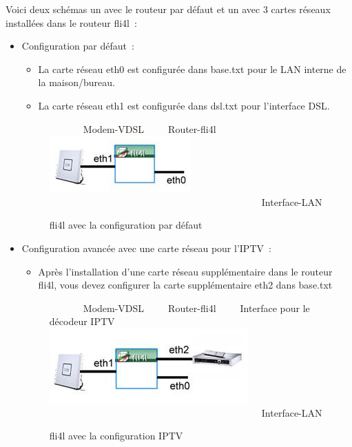 Voici deux schémas un avec le routeur par défaut et un avec 3 cartes réseaux installées dans
le routeur fli4l~:

\begin{itemize}
   \item{Configuration par défaut~:
         \begin{itemize}
            \item{La carte réseau eth0 est configurée dans base.txt pour le LAN interne de la maison/bureau.}
            \item{La carte réseau eth1 est configurée dans dsl.txt pour l'interface DSL.}
         \end{itemize}
         \begin{figure}[ht!]
         \centering
         \selectfont
		 ~~~~~~~Modem-VDSL~~~~~Router-fli4l~~~~~~~~~~~~~~~~\\
         \includegraphics[]{image001}\\
         ~~~~~~~~~~~~~~~~~~~~~~~~~~~~~~~~~~~~~~~~~~~~Interface-LAN
         \caption{fli4l avec la configuration par défaut}
         \label{fig:standardconfig}
         \end{figure}
      }
   \item{Configuration avancée avec une carte réseau pour l'IPTV~:
         \begin{itemize}
            \item{Après l'installation d'une carte réseau supplémentaire dans le routeur fli4l,
			vous devez configurer la carte supplémentaire eth2 dans base.txt}
         \end{itemize}
         \begin{figure}[ht!]
         \centering
         \selectfont
		 ~~~~~~~Modem-VDSL~~~~~Router-fli4l~~~~~Interface pour le décodeur IPTV\\
         \includegraphics[]{image002}\\
         ~~~~~~~~~~~~~~~~~~~~~~~~~~~~~~~~~~~~~~~~~~~~Interface-LAN
         \caption{fli4l avec la configuration IPTV}
         \label{fig:iptvconfig}
         \end{figure}
      }
\end{itemize}

